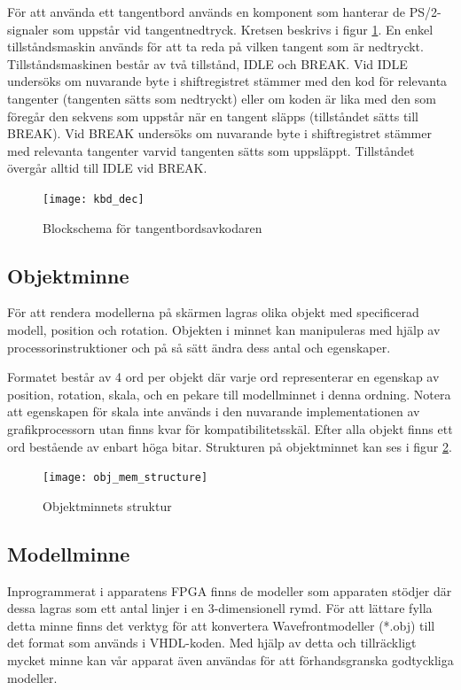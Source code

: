 \documentclass[a4paper]{article}
\begin{document}
    För att använda ett tangentbord används en komponent som hanterar de
    PS/2-signaler som uppstår vid tangentnedtryck. Kretsen beskrivs i figur
    \ref{fig:kbd_dec}. En
    enkel tillståndsmaskin används för att ta reda på vilken tangent som är
    nedtryckt. Tillståndsmaskinen består av två tillstånd, IDLE och BREAK. Vid IDLE
    undersöks om nuvarande byte i shiftregistret stämmer med den kod för relevanta
    tangenter (tangenten sätts som nedtryckt) eller om koden är lika med den som
    föregår den sekvens som uppstår när en tangent släpps (tillståndet sätts till
    BREAK). Vid BREAK undersöks om nuvarande byte i shiftregistret stämmer med
    relevanta tangenter varvid tangenten sätts som uppsläppt. Tillståndet övergår
    alltid till IDLE vid BREAK.  

    \begin{figure}[H]
        \centering
        \texttt{[image: kbd\_dec]}
        \caption{Blockschema för tangentbordsavkodaren}
        \label{fig:kbd_dec}
    \end{figure}

    \subsection{Objektminne}

    För att rendera modellerna på skärmen lagras olika objekt med specificerad
    modell, position och rotation. Objekten i minnet kan manipuleras med hjälp av
    processorinstruktioner och på så sätt ändra dess antal och egenskaper. 

    Formatet består av 4 ord per objekt där varje ord representerar en egenskap av
    position, rotation, skala, och en pekare till modellminnet i denna ordning.
    Notera att egenskapen för skala inte används i den nuvarande implementationen av
    grafikprocessorn utan finns kvar för kompatibilitetsskäl. Efter alla objekt
    finns ett ord bestående av enbart höga bitar. Strukturen på objektminnet kan ses
    i figur \ref{fig:obj_mem_structure}. 

    \begin{figure}[H]
        \centering
        \texttt{[image: obj\_mem\_structure]}
        \caption{Objektminnets struktur}
        \label{fig:obj_mem_structure}
    \end{figure}

    \subsection{Modellminne}
    Inprogrammerat i apparatens FPGA finns de modeller som apparaten stödjer där dessa lagras som
    ett antal linjer i en 3-dimensionell rymd. För att lättare fylla detta minne finns det verktyg
    för att konvertera Wavefrontmodeller (*.obj) till det format som används i VHDL-koden. Med 
    hjälp av detta och tillräckligt mycket minne kan vår apparat även användas för att
    förhandsgranska godtyckliga modeller.
\end{document}
